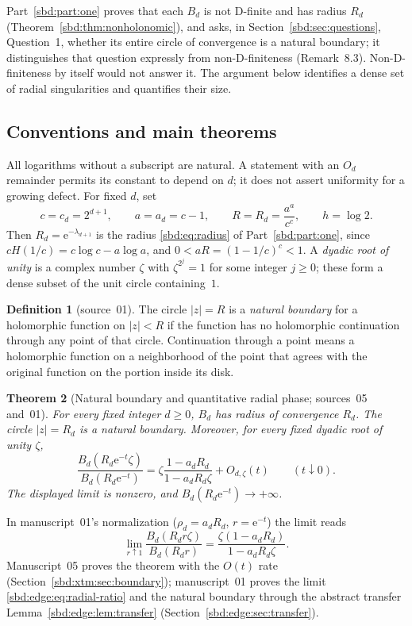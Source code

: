 \documentclass[11pt,a4paper]{article}
\newtheorem{theorem}{Theorem}[section]
\theoremstyle{definition}
\newtheorem{definition}[theorem]{Definition}
\newcommand{\e}{\mathrm e}
\begin{document}
Part~\ref{sbd:part:one} proves that each $B_d$ is not D-finite and has
radius $R_d$ (Theorem~\ref{sbd:thm:nonholonomic}), and asks, in
Section~\ref{sbd:sec:questions}, Question~1, whether its entire circle of
convergence is a natural boundary; it distinguishes that question
expressly from non-D-finiteness (Remark~8.3). Non-D-finiteness by itself
would not answer it. The argument below identifies a dense set of radial
singularities and quantifies their size.

\subsection{Conventions and main theorems}
All logarithms without a subscript are natural. A statement with an $O_d$
remainder permits its constant to depend on $d$; it does not assert
uniformity for a growing defect. For fixed $d$, set
\begin{equation}\label{sbd:xtm:eq:constants}
 c=c_d=2^{d+1},\qquad a=a_d=c-1,\qquad
 R=R_d=\frac{a^a}{c^c},\qquad h=\log2.
\end{equation}
Then $R_d=\e^{-\lambda_{d+1}}$ is the radius \eqref{sbd:eq:radius} of
Part~\ref{sbd:part:one}, since $cH(1/c)=c\log c-a\log a$, and
$0<aR=(1-1/c)^c<1$. A \emph{dyadic root of unity} is a complex number $\zeta$
with $\zeta^{2^j}=1$ for some integer $j\ge0$; these form a dense subset of
the unit circle containing~$1$.

\begin{definition}[source~01]\label{sbd:edge:def:boundary}
The circle $|z|=R$ is a \emph{natural boundary} for a holomorphic function
on $|z|<R$ if the function has no holomorphic continuation through any point
of that circle. Continuation through a point means a holomorphic function
on a neighborhood of the point that agrees with the original function on
the portion inside its disk.
\end{definition}

\begin{theorem}[Natural boundary and quantitative radial phase; sources~05 and~01]
\label{sbd:xtm:thm:main-boundary}
For every fixed integer $d\ge0$, $B_d$ has radius of convergence $R_d$.
The circle $|z|=R_d$ is a natural boundary. Moreover, for every fixed
dyadic root of unity $\zeta$,
\begin{equation}\label{sbd:xtm:eq:phase-main}
 \frac{B_d(R_d\e^{-t}\zeta)}{B_d(R_d\e^{-t})}
 =\zeta\frac{1-a_dR_d}{1-a_dR_d\zeta}
   +O_{d,\zeta}(t)\qquad(t\downarrow0).
\end{equation}
The displayed limit is nonzero, and $B_d(R_d\e^{-t})\to+\infty$.
\end{theorem}
In manuscript~01's normalization ($\rho_d=a_dR_d$, $r=\e^{-t}$) the
limit reads
\begin{equation}\label{sbd:edge:eq:radial-ratio}
 \lim_{r\uparrow1}\frac{B_d(R_dr\zeta)}{B_d(R_dr)}
 =\frac{\zeta(1-a_dR_d)}{1-a_dR_d\zeta}.
\end{equation}
Manuscript~05 proves the theorem with the $O(t)$ rate
(Section~\ref{sbd:xtm:sec:boundary}); manuscript~01 proves the limit
\eqref{sbd:edge:eq:radial-ratio} and the natural boundary through the
abstract transfer Lemma~\ref{sbd:edge:lem:transfer}
(Section~\ref{sbd:edge:sec:transfer}).
\end{document}
